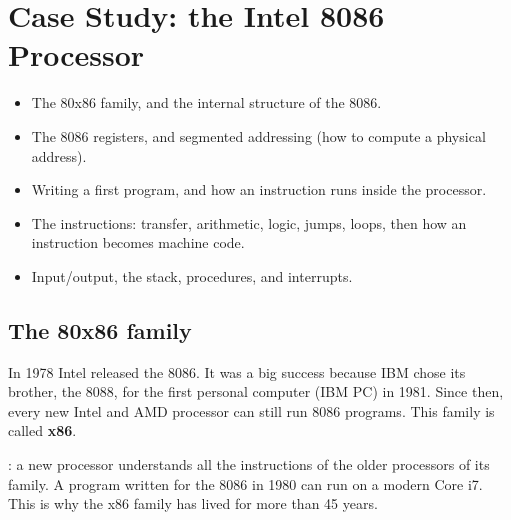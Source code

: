 \chapter{Case Study: the Intel 8086 Processor}

\begin{khulasa}
\begin{itemize}
    \item The 80x86 family, and the internal structure of the 8086.
    \item The 8086 registers, and segmented addressing (how to compute a physical address).
    \item Writing a first program, and how an instruction runs inside the processor.
    \item The instructions: transfer, arithmetic, logic, jumps, loops, then how an instruction becomes machine code.
    \item Input/output, the stack, procedures, and interrupts.
\end{itemize}
\end{khulasa}

\section{The 80x86 family}

In 1978 Intel released the 8086. It was a big success because IBM chose its brother, the 8088, for the first
personal computer (IBM PC) in 1981. Since then, every new Intel and AMD processor can still run 8086 programs.
This family is called \textbf{x86}.

\begin{tarif}
    : a new processor understands all the instructions
    of the older processors of its family. A program written for the 8086 in 1980 can run on a modern Core i7.
    This is why the x86 family has lived for more than 45 years.
\end{tarif}

